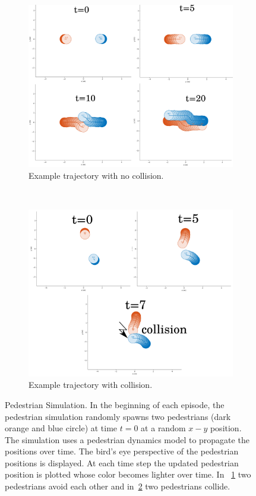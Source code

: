 \begin{figure}[]
	\begin{subfigure}[]{1\linewidth}
		\centering
		\includegraphics[width=0.95\linewidth]{figures/sim_no_coll.png}
		\caption{Example trajectory with no collision.}
		\label{fig:sim_no_coll}
	\end{subfigure}
	\\
	\begin{subfigure}[]{1\linewidth}
		\centering
		\includegraphics[width=0.95\linewidth]{figures/sim_coll.png}
		\caption{Example trajectory with collision.}
		\label{fig:sim_coll}
	\end{subfigure}
    \caption{Pedestrian Simulation. In the beginning of each episode, the pedestrian simulation randomly spawns two pedestrians (dark orange and blue circle) at time $t=0$ at a random $x-y$ position. The simulation uses a pedestrian dynamics model to propagate the positions over time. The  bird's eye perspective of the pedestrian positions is displayed. At each time step the updated pedestrian position is plotted whose color becomes lighter over time. In ~\cref{fig:sim_no_coll} two pedestrians avoid each other and in~\cref{fig:sim_coll} two pedestrians collide.} 
    \label{fig:ped_sim}
\end{figure}

